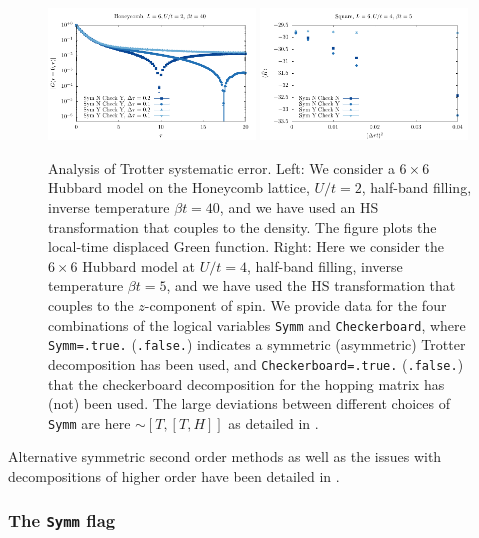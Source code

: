 \begin{figure}
\center
\includegraphics[width=0.49\textwidth]{Figures/Dtau_1/Dtau_1.pdf}
\includegraphics[width=0.49\textwidth]{Figures/Dtau/Dtau.pdf}

\caption{Analysis of  Trotter systematic error.
        Left:    We consider a $6 \times 6$ Hubbard model on the Honeycomb lattice, $U/t=2$, half-band filling,  inverse temperature $\beta t =40$,  and we have used an HS transformation that couples to  the density.    The figure plots the  local-time displaced Green function.
        Right: Here we consider the $6\times 6$ Hubbard model at $U/t=4$, half-band filling,  inverse temperature $\beta t =5$, and we have used the HS transformation that couples to the $z$-component of spin.  We provide data for the four combinations of  the logical variables \texttt{Symm}  and \texttt{Checkerboard}, where  \texttt{Symm=.true.}  (\texttt{.false.})  indicates a symmetric  (asymmetric) Trotter decomposition has been used, and  \texttt{Checkerboard=.true.}  (\texttt{.false.})   that the checkerboard decomposition for the hopping matrix has (not) been used.
        The large deviations between different choices of \texttt{Symm} are here $\sim [T, [T,H]]$ as detailed in \cite{goth2020}.
  }
        \label{Trotter.fig}
\end{figure}

Alternative symmetric second order methods as well as the issues with decompositions of higher order 
have been detailed in \cite{goth2020}.

\subsubsection{The \texttt{Symm} flag} 

